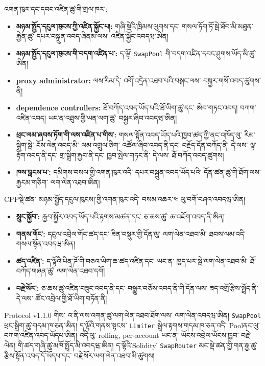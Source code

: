 \documentclass[11pt]{article}
\begin{document}
འགན་ཁུར་དང་དབང་འཛིན་ཚུ་གི་གྲལ་ཁར་:

\begin{itemize}[leftmargin=*]
\item \textbf{མཉམ་སྤྱོད་དངུལ་ཁུངས་ཀྱི་འཛིན་སྐྱོང་པ།:} གཞི་སྡེའི་ཁྲིམས་ལུགས་དང་ གསལ་ཏོག་ཏོ་སྦེ་ཐོབ་མི་མཐུན་རྐྱེན་ཚུ་ དཔར་བསྐྲུན་འབད་ཞིནམ་ལས་ འཛིན་སྐྱོང་འབདཝ་ཨིན།
\item \textbf{མཉམ་སྤྱོད་དངུལ་ཁུངས་གི་བདག་འཛིན་པ་:} ད་ལྟོ་ \texttt{SwapPool} གི་བདག་འཛིན་དབང་ཤུགས་ཡོད་མི་ཚུ་ཨིན།
\item \textbf{proxy administrator:} ལས་རིམ་དེ་ འགོ་འདྲེན་འཐབ་པའི་བསྒང་ལས་ བསྐྱར་གསོ་འབད་ཚུགས་ནི།
\item \textbf{dependence controllers:} ཐོ་བཀོད་འབད་ཡོད་པའི་ཐོ་ཡིག་ཚུ་དང་ ཨེབ་གཏང་འབད། བཀག་འཛིན་འབད། ཡང་ན་འཐུས་གྱི་ཡན་ལག་ཚུ་ བསྐྱར་ཞིབ་འབདཝ་ཨིན།
\item \textbf{ཕྲང་ལམ་ཞབས་ཏོག་གི་ལས་འཛིན་པ་གིས་:} གསལ་སྟོན་འབད་ཡོད་པའི་ཁྱབ་ཚད་ཀྱི་ནང་འཁོད་ལུ་ རིམ་སྒྲིག་སྦེ་ ངོས་ལེན་འབད་མི་ ལམ་འགྲུལ་ཅིག་ འཚོལ་ཞིབ་འབད་ནི་དང་ བརྗོད་དོན་བཀོད་ནི་ དེ་ལས་ ལྟ་རྟོག་འབད་ནི་དང་ གྲ་སྒྲིག་རྐྱབ་ནི་དང་ ཁྱབ་སྤེལ་གཏང་ནི་ དེ་ལས་ ཐོ་བཀོད་འབད་ཚུགས།
\item \textbf{ཁས་བླངས་པ་:} དམིགས་བསལ་གྱི་འགན་ཁུར་འདི་ དཔར་བསྐྲུན་འབད་ཡོད་པའི་ དོན་ཚན་ཚུ་གི་ཐོག་ལས་རྐྱངམ་གཅིག་ ལག་ལེན་འཐབ་ཨིན།
\end{itemize}
CPPསྡེ་ཚན་ མཉམ་སྤྱོད་དངུལ་ཁུངས།་གྱི་འགན་ཁུར་འདི་ བསམ་འཆར་༤ ལུ་བགོ་བཤའ་འབདཝ་ཨིན།

\begin{itemize}[leftmargin=*]
\item \textbf{སྲུང་སྐྱོབ་:} རྒྱབ་སྐྱོར་འབད་ཡོད་པའི་རྟགས་མཚན་དང་ ཅ་ཆས་ཚུ་ ཆ་འཇོག་འབད་ནི་ཨིན།
\item \textbf{གནས་གོང་:} དངུལ་འབྲེལ་གོང་ཚད་དང་ ཟིན་བསྡུར་གྱི་དོན་ལུ་ ལག་ལེན་འཐབ་མི་ ཐབས་ལམ་འདི་ གསལ་སྟོན་འབདཝ་ཨིན།
\item \textbf{ཚད་འཛིན་:} ད་ལྟོའི་པིན་ཌོ་གི་བཅའ་ཡིག་ཆ་ཚད་འཛིན་དང་ ཡང་ན་ ཁྱད་པར་སྦེ་ལག་ལེན་འཐབ་མི་ ཐོ་བཀོད་གཞན་ཚུ་ ལག་ལེན་འཐབ་དགོ།
\item \textbf{བརྗེ་སོར་:} ཅ་ཆས་ཚུ་འཛིན་བཟུང་འབད་ནི་དང་ བསྒྱུར་བཅོས་འབད་ནི་གི་དོན་ལས་ ཟད་འགྲོ་རྩིས་སྤྲོད་ནི་ དེ་ལས་ ཚོང་འབྲེལ་གྱི་ཐོ་ཡིག་བཏོན་ནི།
\end{itemize}
Protocol v1.1.0 གིས་ འ་ནི་ལས་འགན་ཚུ་ལག་ལེན་འཐབ་ཐོག་ལས་ ལག་ལེན་འབདཝ་ཨིན། \texttt{SwapPool} ཕྲང་སྒྲིག་ཚུ་གདམ་ཁ་ཅན་ཨིན། ད་ལྟོའི་གནས་སྟངས་ \texttt{Limiter} སྦྲེལ་རྟགས་གདམ་ཁ་ཅན་འདི་ Poolནང་ལུ་ བཀག་འཛིན་འབད་ཡོདཔ་ཨིན། འདི་ལུ་ rolling, per-account ཡང་ན་ ཡོངས་འབྲེལ་ཡོངས་ཁྱབ་ བརྗེ་ལེན། གི་ཚད་གཞི་ཚུ་མཁོ་སྤྲོད་མི་འབདཝ་ཨིན། ད་ལྟོའི་Solidity་ \texttt{SwapRouter} མང་སྡེ་ཚན་གྱི་གན་རྒྱ་ཚུ་ རྩིས་སྟོན་འབད་དོ་ཡོདཔ་དང་ བརྗེ་སོར་ལག་ལེན་འཐབ་མི་ཚུགས།
\end{document}
